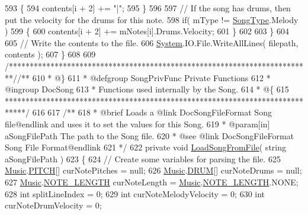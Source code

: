 \begin{DoxyCodeInclude}
593             \{
594                 contents[i + 2] += \textcolor{stringliteral}{"|"};
595             \}
596 
597             \textcolor{comment}{// If the song has drums, then put the velocity for the drums for this note.}
598             \textcolor{keywordflow}{if}( mType != \hyperlink{group___song_enums_gae681a1f001333e39fc1cb4fea97bfe1b}{SongType}.Melody )
599             \{
600                 contents[i + 2] += mNotes[i].Drums.Velocity;
601             \}
602 
603         \}
604 
605         \textcolor{comment}{// Write the contents to the file.}
606         \hyperlink{namespace_system}{System}.IO.File.WriteAllLines( filepath, contents );
607     \}
608 
609     \textcolor{comment}{/*************************************************************************/}\textcolor{comment}{/** }
610 \textcolor{comment}{     * @\}}
611 \textcolor{comment}{     * @defgroup SongPrivFunc Private Functions}
612 \textcolor{comment}{     * @ingroup DocSong}
613 \textcolor{comment}{     * Functions used internally by the Song.}
614 \textcolor{comment}{     * @\{}
615 \textcolor{comment}{    *****************************************************************************/}
616 \textcolor{comment}{}
617 \textcolor{comment}{    /**}
618 \textcolor{comment}{     * @brief Loads a @link DocSongFileFormat Song file@endlink and uses it to set the values for this
       Song.  }
619 \textcolor{comment}{     * @param[in] aSongFilePath The path to the Song file.}
620 \textcolor{comment}{     * @see @link DocSongFileFormat Song File Format@endlink}
621 \textcolor{comment}{    */}
622     \textcolor{keyword}{private} \textcolor{keywordtype}{void} \hyperlink{group___song_priv_func_ga5c8edd8f7ebeab0d93f5619a644c30f5}{LoadSongFromFile}( \textcolor{keywordtype}{string} aSongFilePath )
623     \{
624         \textcolor{comment}{// Create some variables for parsing the file.}
625         \hyperlink{class_music}{Music}.\hyperlink{group___music_enums_ga508f69b199ea518f935486c990edac1d}{PITCH}[] curNotePitches = null;
626         \hyperlink{class_music}{Music}.\hyperlink{group___music_enums_gade475b4382c7066d1af13e7c13c029b6}{DRUM}[] curNoteDrums = null;
627         \hyperlink{class_music}{Music}.\hyperlink{group___music_enums_gaf11b5f079adbb21c800b9eca1c5c3cbd}{NOTE\_LENGTH} curNoteLength = \hyperlink{class_music}{Music}.\hyperlink{group___music_enums_gaf11b5f079adbb21c800b9eca1c5c3cbd}{NOTE\_LENGTH}.NONE;
628         \textcolor{keywordtype}{int} splitLineIndex = 0;
629         \textcolor{keywordtype}{int} curNoteMelodyVelocity = 0;
630         \textcolor{keywordtype}{int} curNoteDrumVelocity = 0;

\end{DoxyCodeInclude}
